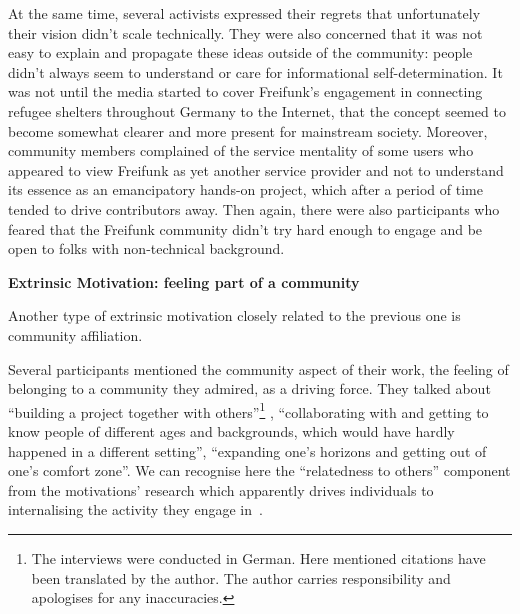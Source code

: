 At the same time, several activists expressed their regrets that unfortunately their vision didn't scale technically.
They were also concerned that it was not easy to explain and propagate these ideas outside of the community: people didn't always seem to understand or care for informational self-determination.
It was not until the media started to cover Freifunk's engagement in connecting refugee shelters throughout Germany to the Internet, that the concept seemed to become somewhat clearer and more present for mainstream society.
Moreover, community members complained of the service mentality of some users who appeared to view Freifunk as yet another service provider and not to understand its essence as an emancipatory hands-on project, which after a period of time tended to drive contributors away.
Then again, there were also participants who feared that the Freifunk community didn't try hard enough to engage and be open to folks with non-technical background.

\begin{comment}
Although net neutrality is one of the key principles in the Pico-Peering-Agreement, the minimal consensus paper/document(?) for all Freifunk communities/free network projects, not all of the survey participants interpreted the notion the same way, nor did they grant it equal importance.
\end{comment}


\textbf{Extrinsic Motivation: feeling part of a community}

Another type of extrinsic motivation closely related to the previous one is community affiliation.

Several participants mentioned the community aspect of their work, the feeling of belonging to a community they admired, as a driving force.
They talked about ``building a project together with others''\footnote{The interviews were conducted in German. Here mentioned citations have been translated by the author. The author carries responsibility and apologises for any inaccuracies.}
, ``collaborating with and getting to know people of different ages and backgrounds, which would have hardly happened in a different setting'', ``expanding one's horizons and getting out of one's comfort zone''.
We can recognise here the ``relatedness to others'' component from the motivations' research which apparently drives individuals to internalising the activity they engage in~\cite{RyDe2000}.

